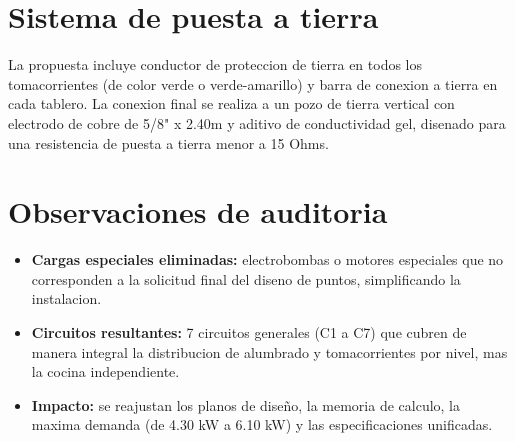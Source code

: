\section{Sistema de puesta a tierra}

La propuesta incluye conductor de proteccion de tierra en todos los tomacorrientes (de color verde o verde-amarillo) y barra de conexion a tierra en cada tablero. La conexion final se realiza a un pozo de tierra vertical con electrodo de cobre de 5/8" x 2.40m y aditivo de conductividad gel, disenado para una resistencia de puesta a tierra menor a 15 Ohms.

\section{Observaciones de auditoria}

\begin{itemize}
  \item \textbf{Cargas especiales eliminadas:} electrobombas o motores especiales que no corresponden a la solicitud final del diseno de puntos, simplificando la instalacion.
  \item \textbf{Circuitos resultantes:} 7 circuitos generales (C1 a C7) que cubren de manera integral la distribucion de alumbrado y tomacorrientes por nivel, mas la cocina independiente.
  \item \textbf{Impacto:} se reajustan los planos de diseño, la memoria de calculo, la maxima demanda (de 4.30 kW a 6.10 kW) y las especificaciones unificadas.
\end{itemize}
